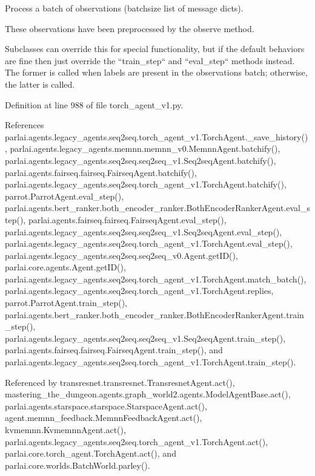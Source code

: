 \begin{DoxyVerb}Process a batch of observations (batchsize list of message dicts).

These observations have been preprocessed by the observe method.

Subclasses can override this for special functionality, but if the
default behaviors are fine then just override the ``train_step`` and
``eval_step`` methods instead. The former is called when labels are
present in the observations batch; otherwise, the latter is called.
\end{DoxyVerb}
 

Definition at line 988 of file torch\+\_\+agent\+\_\+v1.\+py.



References parlai.\+agents.\+legacy\+\_\+agents.\+seq2seq.\+torch\+\_\+agent\+\_\+v1.\+Torch\+Agent.\+\_\+save\+\_\+history(), parlai.\+agents.\+legacy\+\_\+agents.\+memnn.\+memnn\+\_\+v0.\+Memnn\+Agent.\+batchify(), parlai.\+agents.\+legacy\+\_\+agents.\+seq2seq.\+seq2seq\+\_\+v1.\+Seq2seq\+Agent.\+batchify(), parlai.\+agents.\+fairseq.\+fairseq.\+Fairseq\+Agent.\+batchify(), parlai.\+agents.\+legacy\+\_\+agents.\+seq2seq.\+torch\+\_\+agent\+\_\+v1.\+Torch\+Agent.\+batchify(), parrot.\+Parrot\+Agent.\+eval\+\_\+step(), parlai.\+agents.\+bert\+\_\+ranker.\+both\+\_\+encoder\+\_\+ranker.\+Both\+Encoder\+Ranker\+Agent.\+eval\+\_\+step(), parlai.\+agents.\+fairseq.\+fairseq.\+Fairseq\+Agent.\+eval\+\_\+step(), parlai.\+agents.\+legacy\+\_\+agents.\+seq2seq.\+seq2seq\+\_\+v1.\+Seq2seq\+Agent.\+eval\+\_\+step(), parlai.\+agents.\+legacy\+\_\+agents.\+seq2seq.\+torch\+\_\+agent\+\_\+v1.\+Torch\+Agent.\+eval\+\_\+step(), parlai.\+agents.\+legacy\+\_\+agents.\+seq2seq.\+seq2seq\+\_\+v0.\+Agent.\+get\+I\+D(), parlai.\+core.\+agents.\+Agent.\+get\+I\+D(), parlai.\+agents.\+legacy\+\_\+agents.\+seq2seq.\+torch\+\_\+agent\+\_\+v1.\+Torch\+Agent.\+match\+\_\+batch(), parlai.\+agents.\+legacy\+\_\+agents.\+seq2seq.\+torch\+\_\+agent\+\_\+v1.\+Torch\+Agent.\+replies, parrot.\+Parrot\+Agent.\+train\+\_\+step(), parlai.\+agents.\+bert\+\_\+ranker.\+both\+\_\+encoder\+\_\+ranker.\+Both\+Encoder\+Ranker\+Agent.\+train\+\_\+step(), parlai.\+agents.\+legacy\+\_\+agents.\+seq2seq.\+seq2seq\+\_\+v1.\+Seq2seq\+Agent.\+train\+\_\+step(), parlai.\+agents.\+fairseq.\+fairseq.\+Fairseq\+Agent.\+train\+\_\+step(), and parlai.\+agents.\+legacy\+\_\+agents.\+seq2seq.\+torch\+\_\+agent\+\_\+v1.\+Torch\+Agent.\+train\+\_\+step().



Referenced by transresnet.\+transresnet.\+Transresnet\+Agent.\+act(), mastering\+\_\+the\+\_\+dungeon.\+agents.\+graph\+\_\+world2.\+agents.\+Model\+Agent\+Base.\+act(), parlai.\+agents.\+starspace.\+starspace.\+Starspace\+Agent.\+act(), agent.\+memnn\+\_\+feedback.\+Memnn\+Feedback\+Agent.\+act(), kvmemnn.\+Kvmemnn\+Agent.\+act(), parlai.\+agents.\+legacy\+\_\+agents.\+seq2seq.\+torch\+\_\+agent\+\_\+v1.\+Torch\+Agent.\+act(), parlai.\+core.\+torch\+\_\+agent.\+Torch\+Agent.\+act(), and parlai.\+core.\+worlds.\+Batch\+World.\+parley().

